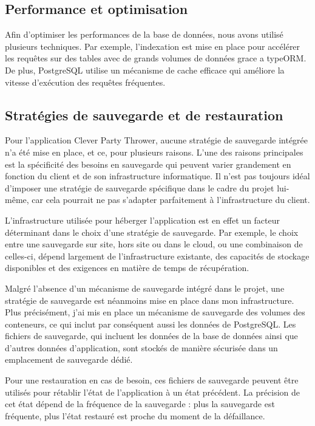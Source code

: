 \subsection{Performance et optimisation}\label{subsec:performance-optimization}
Afin d'optimiser les performances de la base de données, nous avons utilisé plusieurs techniques.
Par exemple, l'indexation est mise en place pour accélérer les requêtes sur des tables avec de grands volumes de données grace a typeORM\@.
De plus, PostgreSQL utilise un mécanisme de cache efficace qui améliore la vitesse d'exécution des requêtes fréquentes.

\subsection{Stratégies de sauvegarde et de restauration}\label{subsec:backup-restore}
Pour l'application Clever Party Thrower, aucune stratégie de sauvegarde intégrée n'a été mise en place, et ce, pour plusieurs raisons.
L'une des raisons principales est la spécificité des besoins en sauvegarde qui peuvent varier grandement en fonction du client et de son infrastructure informatique.
Il n'est pas toujours idéal d'imposer une stratégie de sauvegarde spécifique dans le cadre du projet lui-même, car cela pourrait ne pas s'adapter parfaitement à l'infrastructure du client.

L'infrastructure utilisée pour héberger l'application est en effet un facteur déterminant dans le choix d'une stratégie de sauvegarde.
Par exemple, le choix entre une sauvegarde sur site, hors site ou dans le cloud, ou une combinaison de celles-ci, dépend largement de l'infrastructure existante,
des capacités de stockage disponibles et des exigences en matière de temps de récupération.

Malgré l'absence d'un mécanisme de sauvegarde intégré dans le projet, une stratégie de sauvegarde est néanmoins mise en place dans mon infrastructure.
Plus précisément, j'ai mis en place un mécanisme de sauvegarde des volumes des conteneurs, ce qui inclut par conséquent aussi les données de PostgreSQL.
Les fichiers de sauvegarde, qui incluent les données de la base de données ainsi que d'autres données d'application, sont stockés de manière sécurisée dans un emplacement de sauvegarde dédié.

Pour une restauration en cas de besoin, ces fichiers de sauvegarde peuvent être utilisés pour rétablir l'état de l'application à un état précédent.
La précision de cet état dépend de la fréquence de la sauvegarde : plus la sauvegarde est fréquente, plus l'état restauré est proche du moment de la défaillance.

